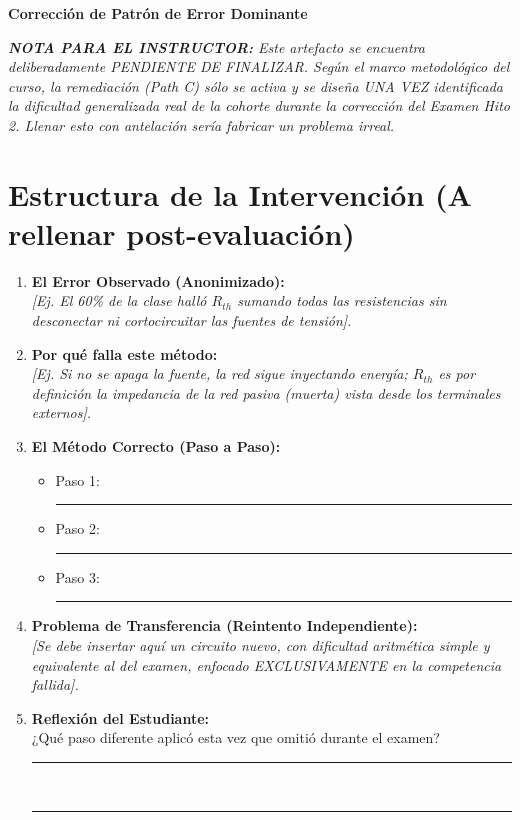 \documentclass[11pt, a4paper]{article}
\begin{document}
\begin{tcolorbox}[colback=red!5!white, colframe=red!70!black, title=\textbf{Hoja de Remediación Dirigida (Path C)}]
    \centering \textbf{Corrección de Patrón de Error Dominante}
\end{tcolorbox}

\noindent\textit{\textbf{NOTA PARA EL INSTRUCTOR:} Este artefacto se encuentra deliberadamente PENDIENTE DE FINALIZAR. Según el marco metodológico del curso, la remediación (Path C) sólo se activa y se diseña UNA VEZ identificada la dificultad generalizada real de la cohorte durante la corrección del Examen Hito 2. Llenar esto con antelación sería fabricar un problema irreal.}

\vspace{0.5cm}
\section*{Estructura de la Intervención (A rellenar post-evaluación)}

\begin{enumerate}
    \item \textbf{El Error Observado (Anonimizado):} \\
    \textit{[Ej. El 60\% de la clase halló $R_{th}$ sumando todas las resistencias sin desconectar ni cortocircuitar las fuentes de tensión].}
    
    \item \textbf{Por qué falla este método:} \\
    \textit{[Ej. Si no se apaga la fuente, la red sigue inyectando energía; $R_{th}$ es por definición la impedancia de la red pasiva (muerta) vista desde los terminales externos].}
    
    \item \textbf{El Método Correcto (Paso a Paso):}
    \begin{itemize}
        \item Paso 1: \rule{10cm}{0.4pt}
        \item Paso 2: \rule{10cm}{0.4pt}
        \item Paso 3: \rule{10cm}{0.4pt}
    \end{itemize}
    
    \item \textbf{Problema de Transferencia (Reintento Independiente):} \\
    \textit{[Se debe insertar aquí un circuito nuevo, con dificultad aritmética simple y equivalente al del examen, enfocado EXCLUSIVAMENTE en la competencia fallida].}
    
    \item \textbf{Reflexión del Estudiante:} \\
    ¿Qué paso diferente aplicó esta vez que omitió durante el examen? \\
    \rule{\textwidth}{0.4pt} \\
    \rule{\textwidth}{0.4pt}
\end{enumerate}
\end{document}
